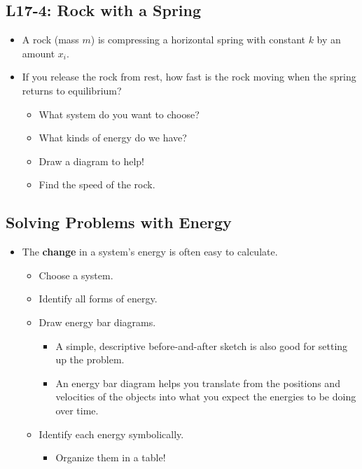\documentclass[]{article}
\newcommand{\Week}{17}
\begin{document}
\begin{PresentSpace}
\vspace{-10pt}
\section*{L\Week-4: Rock with a Spring}
\vspace{-10pt}
\begin{itemize}
	\item A rock (mass $m$) is compressing a horizontal spring with constant $k$ by an amount $x_{i}$.
	\item If you release the rock from rest, how fast is the rock moving when the spring returns to equilibrium?
	\begin{itemize}
		\item What system do you want to choose?
		\item What kinds of energy do we have?
		\item Draw a diagram to help!
		\item Find the speed of the rock.
	\end{itemize}
\end{itemize}
\end{PresentSpace}
\newpage
\begin{TeacherMargin}

\end{TeacherMargin}
\begin{PresentSpace}
\vspace{-10pt}
\section*{Solving Problems with Energy}
\vspace{-10pt}
\begin{itemize}
	\item The \textbf{change} in a system's energy is often easy to calculate.
	\begin{itemize}
		\item Choose a system.
		\item Identify all forms of energy.
		\item Draw energy bar diagrams.
		\begin{itemize}
			\item A simple, descriptive before-and-after sketch is also good for setting up the problem.
			\item An energy bar diagram helps you translate from the positions and velocities of the objects into what you expect the energies to be doing over time.
		\end{itemize}
		\item Identify each energy symbolically.
		\begin{itemize}
			\item Organize them in a table!
		\end{itemize}
	\end{itemize}
\end{itemize}
\end{PresentSpace}
\end{document}

